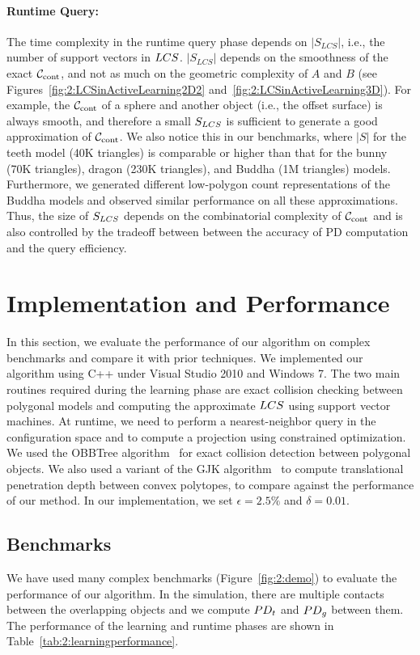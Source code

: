 \paragraph{Runtime Query:} The time complexity in the runtime query
phase depends on $\left| S_{LCS} \right|$, i.e., the number of
support vectors in $LCS$. $\left| S_{LCS} \right|$ depends on
the smoothness of the exact $\mathcal C_\text{cont}$, and not as much on the geometric complexity of $A$ and $B$ (see Figures~\ref{fig:2:LCSinActiveLearning2D2} and~\ref{fig:2:LCSinActiveLearning3D}).
For example, the $\mathcal C_\text{cont}$ of a sphere and another object (i.e., the offset surface) is always smooth, and
therefore a small $S_{LCS}$ is sufficient to generate a good approximation of $\mathcal C_\text{cont}$.
We also notice this in our benchmarks, where $|S|$ for the teeth model (40K triangles) is comparable or higher than that for the bunny (70K triangles), dragon (230K triangles), and Buddha (1M triangles) models. Furthermore, we generated different low-polygon count representations of the Buddha models and observed similar performance on all these approximations.
Thus, the size of
$S_{LCS}$ depends on the combinatorial complexity of $\mathcal C_\text{cont}$ and is also controlled by the tradeoff between 
between the accuracy of PD
computation and the query efficiency.



\section{Implementation and Performance}
\label{sec:2:result}
In this section, we evaluate the performance of our algorithm on complex benchmarks and compare it with prior techniques.
We implemented our algorithm using C++ under Visual Studio 2010
and Windows 7. The two main routines required during the learning phase are exact collision checking between polygonal models and computing the approximate $LCS$ using support vector machines. At runtime, we need to perform a nearest-neighbor query in the configuration space and to compute a projection using constrained optimization. We used the OBBTree algorithm~\cite{Gottschalk:1996:OHS} for exact collision detection between polygonal objects. We also used a variant of the GJK algorithm~\cite{Gino:2001:GDC} to compute translational penetration depth between convex polytopes, to compare against the performance of our method. In our implementation, we set $\epsilon=2.5\%$ and $\delta=0.01$.

\subsection{Benchmarks}
We have used many complex benchmarks (Figure~\ref{fig:2:demo}) to evaluate the performance of our algorithm. In the simulation, there are multiple contacts between the overlapping objects and we compute $PD_t$ and $PD_g$ between them. The performance of the learning and runtime phases are shown in Table~\ref{tab:2:learningperformance}.

